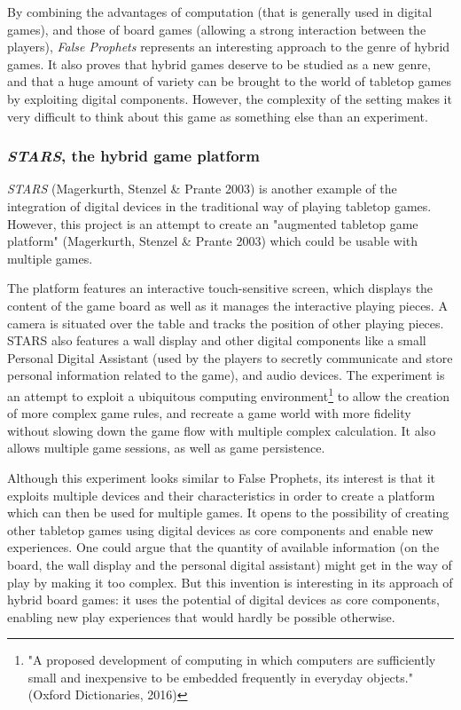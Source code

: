 By combining the advantages of computation (that is generally used in digital games), and those of board games (allowing a strong interaction between the players), \textit{False Prophets} represents an interesting approach to the genre of hybrid games. It also proves that hybrid games deserve to be studied as a new genre, and that a huge amount of variety can be brought to the world of tabletop games by exploiting digital components. However, the complexity of the setting makes it very difficult to think about this game as something else than an experiment. 
\subsubsection{\textit{STARS}, the hybrid game platform}
\textit{STARS} (Magerkurth, Stenzel \& Prante 2003)\cite{art:stars} is another example of the integration of digital devices in the traditional way of playing tabletop games. However, this project is an attempt to create an "augmented tabletop game platform" (Magerkurth, Stenzel \& Prante 2003) which could be usable with multiple games.

The platform features an interactive touch-sensitive screen, which displays the content of the game board as well as it manages the interactive playing pieces. A camera is situated over the table and tracks the position of other playing pieces. STARS also features a wall display and other digital components like a small Personal Digital Assistant (used by the players to secretly communicate and store personal information related to the game), and audio devices. The experiment is an attempt to exploit a ubiquitous computing environment\footnote{"A proposed development of computing in which computers are sufficiently small and inexpensive to be embedded frequently in everyday objects."(Oxford Dictionaries, 2016)} to allow the creation of more complex game rules, and recreate a game world with more fidelity without slowing down the game flow with multiple complex calculation. It also allows multiple game sessions, as well as game persistence. 

Although this experiment looks similar to False Prophets, its interest is that it exploits multiple devices and their characteristics in order to create a platform which can then be used for multiple games. It opens to the possibility of creating other tabletop games using digital devices as core components and enable new experiences. One could argue that the quantity of available information (on the board, the wall display and the personal digital assistant) might get in the way of play by making it too complex. But this invention is interesting in its approach of hybrid board games: it uses the potential of digital devices as core components, enabling new play experiences that would hardly be possible otherwise.
